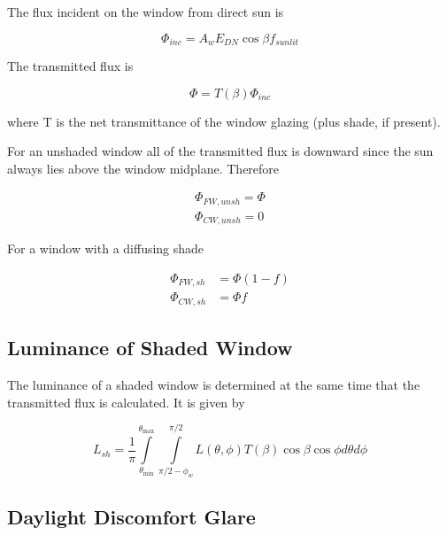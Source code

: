 The flux incident on the window from direct sun is

\begin{equation}
{\Phi_{inc}} = {A_w}{E_{DN}}\cos \beta {f_{sunlit}}
\end{equation}

The transmitted flux is

\begin{equation}
\Phi  = T(\beta ){\Phi_{inc}}
\end{equation}

where T is the net transmittance of the window glazing (plus shade, if present).

For an unshaded window all of the transmitted flux is downward since the sun always lies above the window midplane. Therefore

\begin{equation}
\begin{array}{l}
    \Phi_{FW,unsh} = \Phi \\
    \Phi_{CW,unsh} = 0
\end{array}
\end{equation}

For a window with a diffusing shade

\begin{equation}
  \begin{array}{rl}
    \Phi_{FW,sh} &= \Phi (1 - f) \\
    \Phi_{CW,sh} &= \Phi f
  \end{array}
\end{equation}

\subsection{Luminance of Shaded Window}\label{luminance-of-shaded-window}

The luminance of a shaded window is determined at the same time that the transmitted flux is calculated. It is given by

\begin{equation}
{L_{sh}} = \frac{1}{\pi }\int\limits_{{\theta_{\min }}}^{{\theta_{\max }}} {\int\limits_{\pi /2 - {\phi_w}}^{\pi /2} {L(\theta ,\phi )T(\beta )\cos \beta \cos \phi d\theta d\phi } }
\end{equation}

\subsection{Daylight Discomfort Glare}\label{daylight-discomfort-glare}


